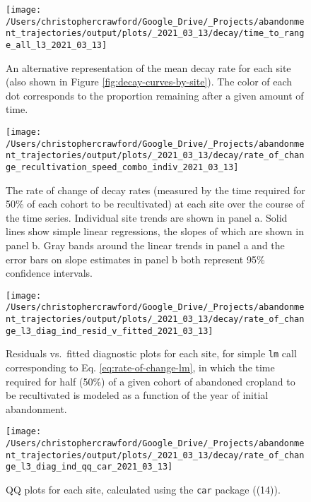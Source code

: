\documentclass[9pt,twoside,lineno]{pnas-new}
\begin{document}
\begin{figure}
\texttt{[image: /Users/christophercrawford/Google\_Drive/\_Projects/abandonment\_trajectories/output/plots/\_2021\_03\_13/decay/time\_to\_range\_all\_l3\_2021\_03\_13]} \caption{An alternative representation of the mean decay rate for each site (also shown in Figure \ref{fig:decay-curves-by-site}). The color of each dot corresponds to the proportion remaining after a given amount of time.}\label{fig:decay-time-to-range}
\end{figure}



\begin{figure}
\texttt{[image: /Users/christophercrawford/Google\_Drive/\_Projects/abandonment\_trajectories/output/plots/\_2021\_03\_13/decay/rate\_of\_change\_recultivation\_speed\_combo\_indiv\_2021\_03\_13]} \caption{The rate of change of decay rates (measured by the time required for 50\% of each cohort to be recultivated) at each site over the course of the time series. Individual site trends are shown in panel a. Solid lines show simple linear regressions, the slopes of which are shown in panel b. Gray bands around the linear trends in panel a and the error bars on slope estimates in panel b both represent 95\% confidence intervals.}\label{fig:decay-rate-of-change}
\end{figure}



\begin{figure}
\texttt{[image: /Users/christophercrawford/Google\_Drive/\_Projects/abandonment\_trajectories/output/plots/\_2021\_03\_13/decay/rate\_of\_change\_l3\_diag\_ind\_resid\_v\_fitted\_2021\_03\_13]} \caption{Residuals vs.~fitted diagnostic plots for each site, for simple \texttt{lm} call corresponding to Eq. \eqref{eq:rate-of-change-lm}, in which the time required for half (50\%) of a given cohort of abandoned cropland to be recultivated is modeled as a function of the year of initial abandonment.}\label{fig:rate-of-change-diag-resid-fitted}
\end{figure}



\begin{figure}
\texttt{[image: /Users/christophercrawford/Google\_Drive/\_Projects/abandonment\_trajectories/output/plots/\_2021\_03\_13/decay/rate\_of\_change\_l3\_diag\_ind\_qq\_car\_2021\_03\_13]} \caption{QQ plots for each site, calculated using the \texttt{car} package ((14)).}\label{fig:rate-of-change-diag-qq}
\end{figure}
\end{document}
